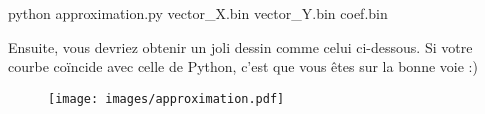 \documentclass[a4paper, 12pt]{article}
\begin{document}
\begin{spverbatim}
    python approximation.py vector_X.bin vector_Y.bin coef.bin
\end{spverbatim}

\noindent Ensuite, vous devriez obtenir un joli dessin comme celui ci-dessous. Si votre courbe coïncide avec celle de Python, c'est que vous êtes sur la bonne voie :)

\begin{figure} [!htb]
    \begin{center}
        \texttt{[image: images/approximation.pdf]}
    \end{center}
\end{figure}
\end{document}
